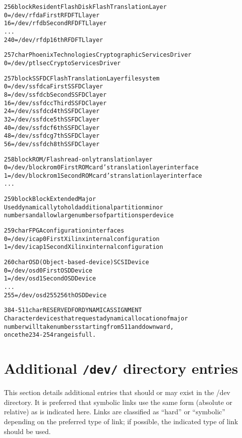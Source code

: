 \documentclass[a4paper,8pt,english]{sphinxmanual}
\begin{document}
\begin{alltt}
 256 block      Resident Flash Disk Flash Translation Layer
                  0 = /dev/rfda         First RFD FTL layer
                 16 = /dev/rfdb         Second RFD FTL layer
                  ...
                240 = /dev/rfdp         16th RFD FTL layer

 257 char       Phoenix Technologies Cryptographic Services Driver
                  0 = /dev/ptlsec       Crypto Services Driver

 257 block      SSFDC Flash Translation Layer filesystem
                  0 = /dev/ssfdca       First SSFDC layer
                  8 = /dev/ssfdcb       Second SSFDC layer
                 16 = /dev/ssfdcc       Third SSFDC layer
                 24 = /dev/ssfdcd       4th SSFDC layer
                 32 = /dev/ssfdce       5th SSFDC layer
                 40 = /dev/ssfdcf       6th SSFDC layer
                 48 = /dev/ssfdcg       7th SSFDC layer
                 56 = /dev/ssfdch       8th SSFDC layer

 258 block      ROM/Flash read-only translation layer
                  0 = /dev/blockrom0    First ROM card's translation layer interface
                  1 = /dev/blockrom1    Second ROM card's translation layer interface
                  ...

 259 block      Block Extended Major
                  Used dynamically to hold additional partition minor
                  numbers and allow large numbers of partitions per device

 259 char       FPGA configuration interfaces
                  0 = /dev/icap0        First Xilinx internal configuration
                  1 = /dev/icap1        Second Xilinx internal configuration

 260 char       OSD (Object-based-device) SCSI Device
                  0 = /dev/osd0         First OSD Device
                  1 = /dev/osd1         Second OSD Device
                  ...
                  255 = /dev/osd255     256th OSD Device

 384-511 char   RESERVED FOR DYNAMIC ASSIGNMENT
                Character devices that request a dynamic allocation of major
                number will take numbers starting from 511 and downward,
                once the 234-254 range is full.

\end{alltt}


\section{Additional \texttt{/dev/} directory entries}
\label{admin-guide/devices:additional-dev-directory-entries}
This section details additional entries that should or may exist in
the /dev directory.  It is preferred that symbolic links use the same
form (absolute or relative) as is indicated here.  Links are
classified as ``hard'' or ``symbolic'' depending on the preferred type of
link; if possible, the indicated type of link should be used.
\end{document}
